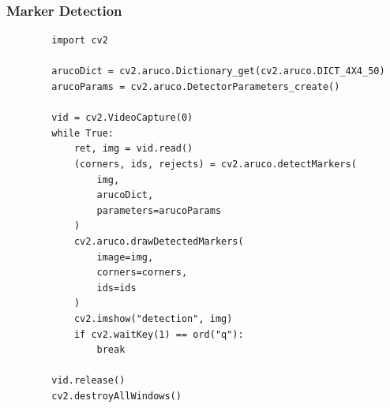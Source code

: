 \documentclass[12pt,letterpaper]{beamer}
\begin{document}
\begin{frame}[fragile]
    \frametitle{Marker Detection}
    \scriptsize
    \begin{verbatim}
        import cv2

        arucoDict = cv2.aruco.Dictionary_get(cv2.aruco.DICT_4X4_50)
        arucoParams = cv2.aruco.DetectorParameters_create()

        vid = cv2.VideoCapture(0)
        while True:
            ret, img = vid.read()
            (corners, ids, rejects) = cv2.aruco.detectMarkers(
                img,
                arucoDict,
                parameters=arucoParams
            )
            cv2.aruco.drawDetectedMarkers(
                image=img,
                corners=corners,
                ids=ids
            )
            cv2.imshow("detection", img)
            if cv2.waitKey(1) == ord("q"):
                break

        vid.release()
        cv2.destroyAllWindows()
    \end{verbatim}
\end{frame}
\end{document}
